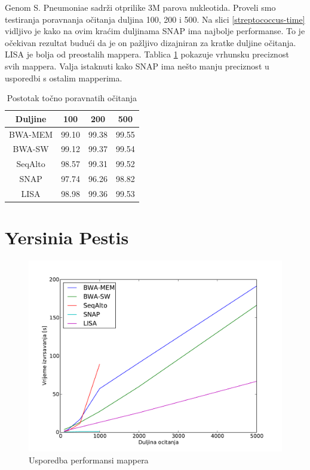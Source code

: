 \documentclass[times, utf8, diplomski]{fer}
\begin{document}
Genom S. Pneumoniae sadrži otprilike 3M parova nukleotida. Proveli smo testiranja poravnanja očitanja duljina 100, 200 i 500. Na slici \ref{streptococcus-time} vidljivo je kako na ovim kraćim duljinama SNAP ima najbolje performanse. To je očekivan rezultat budući da je on pažljivo dizajniran za kratke duljine očitanja. LISA je bolja od preostalih mappera. Tablica \ref{streptococcus-correct} pokazuje vrhunsku preciznost svih mappera. Valja istaknuti kako SNAP ima nešto manju preciznost u usporedbi s ostalim mapperima.

\begin{table}[H]
\centering
\begin{tabular}{|c||c|c|c|}
\hline
	Duljine & 100 & 200 & 500\\
\hline
\hline
	BWA-MEM & 99.10 & 99.38 & 99.55\\
\hline
	BWA-SW  & 99.12 & 99.37 & 99.54\\
\hline
	SeqAlto & 98.57 & 99.31 & 99.52\\
\hline
	SNAP    & 97.74 & 96.26 & 98.82\\
\hline
	LISA    & 98.98 & 99.36 & 99.53\\
\hline
\end{tabular}
\caption{Postotak točno poravnatih očitanja}\label{streptococcus-correct}
\end{table}


\section {Yersinia Pestis}

\begin{figure}[H]
\centering
\includegraphics[width=1.0\textwidth]{../img/yersinia-time.pdf}
\caption{Usporedba performansi mappera}\label{yersinia-time}
\end{figure}
\end{document}
